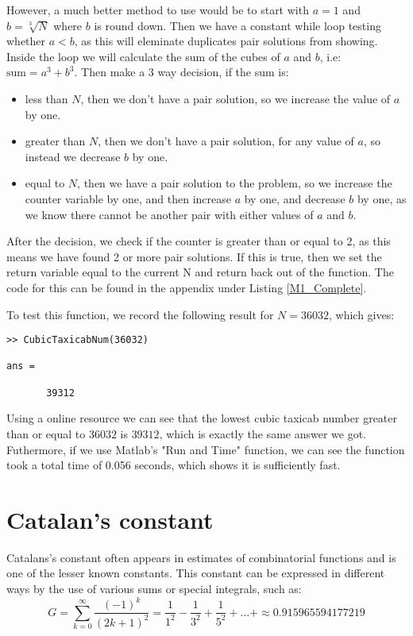 \documentclass[12pt]{article}
\begin{document}
However, a much better method to use would be to start with $a = 1$ and $b = \sqrt[3]{N}$ where $b$ is round down. Then we have a constant while loop testing whether $a<b$, as this will eleminate duplicates pair solutions from showing. Inside the loop we will calculate the sum of the cubes of $a$ and $b$, i.e: $\text{sum} = a^3+b^3$. Then make a 3 way decision, if the sum is:
\begin{itemize}[label=$-$]
  \item less than $N$, then we don't have a pair solution, so we increase the value of $a$ by one.
  \item greater than $N$, then we don't have a pair solution, for any value of $a$, so instead we decrease $b$ by one.
  \item equal to $N$, then we have a pair solution to the problem, so we increase the counter variable by one, and then increase $a$ by one, and decrease $b$ by one, as we know there cannot be another pair with either values of $a$ and $b$.
\end{itemize}
After the decision, we check if the counter is greater than or equal to 2, as this means we have found 2 or more pair solutions. If this is true, then we set the return variable equal to the current N and return back out of the function. The code for this can be found in the appendix under Listing \ref{M1_Complete}.

To test this function, we record the following result for $N=36032$, which gives:
\begin{lstlisting}[title={Result for Cubic Taxicab Number}]
>> CubicTaxicabNum(36032)

ans =

       39312
\end{lstlisting}
Using a online resource \cite{Taxicab_Numbers} we can see that the lowest cubic taxicab number greater than or equal to $36032$ is $39312$, which is exactly the same answer we got. Futhermore, if we use Matlab's "Run and Time" function, we can see the function took a total time of 0.056 seconds, which shows it is sufficiently fast.


\section{Catalan’s constant}
Catalans's constant often appears in estimates of combinatorial functions \cite{Catalan_Constant} and is one of the lesser known constants. This constant can be expressed in different ways by the use of various sums or special integrals, such as:
\begin{equation*}
G = \sum^{\infty}_{k=0}\frac{(-1)^k}{(2k+1)^2} = \frac{1}{1^2}-\frac{1}{3^2}+\frac{1}{5^2}+\ldots+ \approx 0.915965594177219
\end{equation*}
\end{document}
